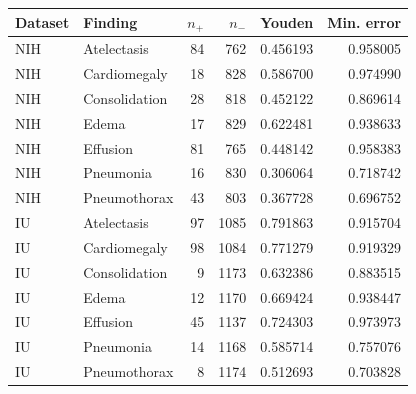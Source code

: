 \begin{center}\small\setlength{\tabcolsep}{5pt}\begin{tabular}{llrrrr}\toprule
Dataset & Finding & $n_+$ & $n_-$ & Youden & Min. error\\\midrule
NIH & Atelectasis & 84 & 762 & 0.456193 & 0.958005 \\
NIH & Cardiomegaly & 18 & 828 & 0.586700 & 0.974990 \\
NIH & Consolidation & 28 & 818 & 0.452122 & 0.869614 \\
NIH & Edema & 17 & 829 & 0.622481 & 0.938633 \\
NIH & Effusion & 81 & 765 & 0.448142 & 0.958383 \\
NIH & Pneumonia & 16 & 830 & 0.306064 & 0.718742 \\
NIH & Pneumothorax & 43 & 803 & 0.367728 & 0.696752 \\
IU & Atelectasis & 97 & 1085 & 0.791863 & 0.915704 \\
IU & Cardiomegaly & 98 & 1084 & 0.771279 & 0.919329 \\
IU & Consolidation & 9 & 1173 & 0.632386 & 0.883515 \\
IU & Edema & 12 & 1170 & 0.669424 & 0.938447 \\
IU & Effusion & 45 & 1137 & 0.724303 & 0.973973 \\
IU & Pneumonia & 14 & 1168 & 0.585714 & 0.757076 \\
IU & Pneumothorax & 8 & 1174 & 0.512693 & 0.703828 \\
\bottomrule\end{tabular}\end{center}
